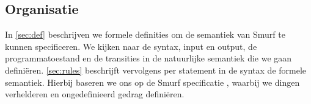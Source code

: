 \subsection{Organisatie} %

In \autoref{sec:def} beschrijven we formele definities om de semantiek van
Smurf te kunnen specificeren. We kijken naar de syntax, input en output, de
programmatoestand en de transities in de natuurlijke semantiek die we gaan
definiëren. \autoref{sec:rules} beschrijft vervolgens per statement in de
syntax de formele semantiek. Hierbij baseren we ons op de Smurf specificatie
\cite{safalra}, waarbij we dingen verhelderen en ongedefinieerd gedrag
definiëren.

